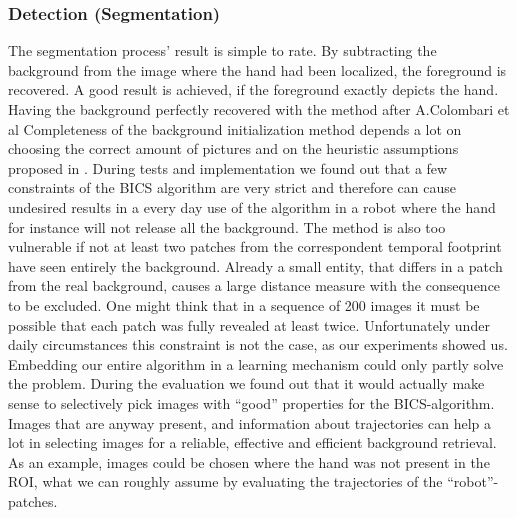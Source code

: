 \subsubsection{Detection (Segmentation)}
\label{results:evaluation:segmentation}
%
The segmentation process' result is simple to rate. By subtracting the background from the image where the hand had been localized, the foreground is recovered. A good result is achieved, if the foreground exactly depicts the hand. Having the background perfectly recovered with the method after A.Colombari et al \cite{} Completeness of the background initialization method depends a lot on choosing the correct amount of pictures and on the heuristic assumptions proposed in \cite{BICS06}. During tests and implementation we found out that a few constraints of the BICS algorithm are very strict and therefore can cause undesired results in a every day use of the algorithm in a robot where the hand for instance will not release all the background. The method is also too vulnerable if not at least two patches from the correspondent temporal footprint have seen entirely the background. Already a small entity, that differs in a patch from the real background, causes a large distance measure with the consequence to be excluded. One might think that in a sequence of 200 images it must be possible that each patch was fully revealed at least twice. Unfortunately under daily circumstances this constraint is not the case, as our experiments showed us. Embedding our entire algorithm in a learning mechanism could only partly solve the problem. During the evaluation we found out that it would actually make sense to selectively pick images with ``good'' properties for the BICS-algorithm. Images that are anyway present, and information about trajectories can help a lot in selecting images for a reliable, effective and efficient background retrieval. As an example, images could be chosen where the hand was not present in the ROI, what we can roughly assume by evaluating the trajectories of the ``robot''-patches. 